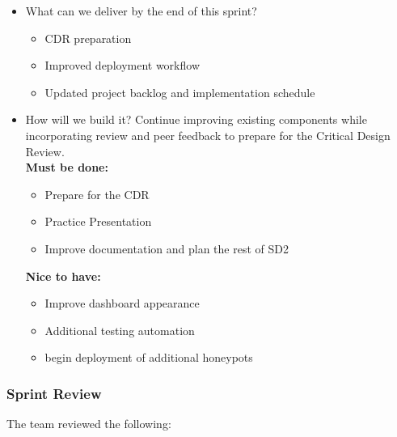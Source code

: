 \documentclass{article}
\begin{document}
\begin{itemize}
    \item What can we deliver by the end of this sprint? 
    \begin{itemize}
    \item CDR preparation 
    \item Improved deployment workflow
    \item Updated project backlog and implementation schedule
    \end{itemize}
   
    \item How will we build it? 
    Continue improving existing components while incorporating review and peer feedback to prepare for the Critical Design Review.
    \\\textbf{Must be done:}

    \begin{itemize}
    \item Prepare for the CDR
    \item Practice Presentation
    \item Improve documentation and plan the rest of SD2
    \end{itemize}
    
    \textbf{Nice to have:}
    
    \begin{itemize}
    \item Improve dashboard appearance
    \item Additional testing automation
    \item begin deployment of additional honeypots
    \end{itemize}
    
\end{itemize}

\subsubsection{Sprint Review}
The team reviewed the following:
\end{document}
